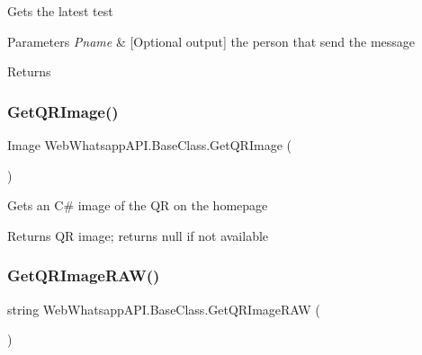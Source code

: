 Gets the latest test 


\begin{DoxyParams}{Parameters}
{\em Pname} & \mbox{[}Optional output\mbox{]} the person that send the message\\
\hline
\end{DoxyParams}
\begin{DoxyReturn}{Returns}

\end{DoxyReturn}
\mbox{\label{class_web_whatsapp_a_p_i_1_1_base_class_ac9738e95307e38b1ef493c1164edb60c}} 
\subsubsection{\texorpdfstring{Get\+Q\+R\+Image()}{GetQRImage()}}
{\footnotesize\ttfamily Image Web\+Whatsapp\+A\+P\+I.\+Base\+Class.\+Get\+Q\+R\+Image (\begin{DoxyParamCaption}{ }\end{DoxyParamCaption})\hspace{0.3cm}{\ttfamily [inline]}}



Gets an C\# image of the QR on the homepage 

\begin{DoxyReturn}{Returns}
QR image; returns null if not available
\end{DoxyReturn}
\mbox{\label{class_web_whatsapp_a_p_i_1_1_base_class_ad181052c89c24e15d53aa81c1afe531c}} 
\subsubsection{\texorpdfstring{Get\+Q\+R\+Image\+R\+A\+W()}{GetQRImageRAW()}}
{\footnotesize\ttfamily string Web\+Whatsapp\+A\+P\+I.\+Base\+Class.\+Get\+Q\+R\+Image\+R\+AW (\begin{DoxyParamCaption}{ }\end{DoxyParamCaption})\hspace{0.3cm}{\ttfamily [inline]}}



